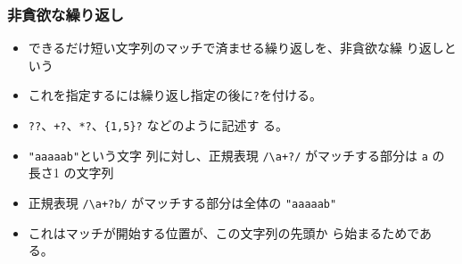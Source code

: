 \begin{frame}[containsverbatim]
 \frametitle{非貪欲な繰り返し}
\begin{itemize}
 \item できるだけ短い文字列のマッチで済ませる繰り返しを、非貪欲な繰
り返しという
 \item これを指定するには繰り返し指定の後に\Verb+?+を付ける。
 \item \Verb-??-、\Verb-+?-、\Verb-*?-、\Verb-{1,5}?- などのように記述す
       る。
 \item \Verb+"aaaaab"+という文字
列に対し、正規表現 \Verb-/\a+?/- がマッチする部分は \Verb+a+ の長さ1
の文字列
 \item 正規表現 \Verb-/\a+?b/- がマッチする部分は全体の
\Verb+"aaaaab"+
 \item これはマッチが開始する位置が、この文字列の先頭か
ら始まるためである。
\end{itemize}
\end{frame}
